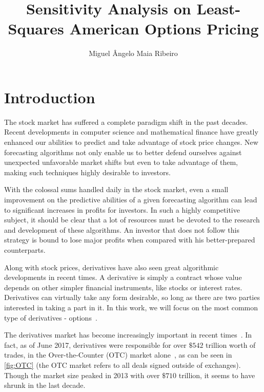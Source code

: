 \documentclass[a4paper,twocolumn,aps,prd,longbibliography,superscriptaddress]{revtex4-1}
\begin{document}
\title{Sensitivity Analysis on Least-Squares American Options Pricing}

\author{Miguel Ângelo Maia Ribeiro}




\maketitle
\section{Introduction}
The stock market has suffered a complete paradigm shift in the past decades. Recent developments in computer science and mathematical finance have greatly enhanced our abilities to predict and take advantage of stock price changes. New forecasting algorithms not only enable us to better defend ourselves against unexpected unfavorable market shifts but even to take advantage of them, making such techniques highly desirable to investors.

With the colossal sums handled daily in the stock market, even a small improvement on the predictive abilities of a given forecasting algorithm can lead to significant increases in profits for investors. In such a highly competitive subject, it should be clear that a lot of resources must be devoted to the research and development of these algorithms. An investor that does not follow this strategy is bound to lose major profits when compared with his better-prepared counterparts.




Along with stock prices, derivatives have also seen great algorithmic developments in recent times. A derivative is simply a contract whose value depends on other simpler financial instruments, like stocks or interest rates. Derivatives can virtually take any form desirable, so long as there are two parties interested in taking a part in it. In this work, we will focus on the most common type of derivatives - options~\cite{Hull}.

The derivatives market has become increasingly important in recent times~\cite{Hull}. In fact, as of June 2017, derivatives were responsible for over $\$542$ trillion worth of trades, in the Over-the-Counter (OTC) market alone~\cite{BIS}, as can be seen in \autoref{fig:OTC} (the OTC market refers to all deals signed outside of exchanges). Though the market size peaked in 2013 with over $\$710$ trillion, it seems to have shrunk in the last decade.
\end{document}
